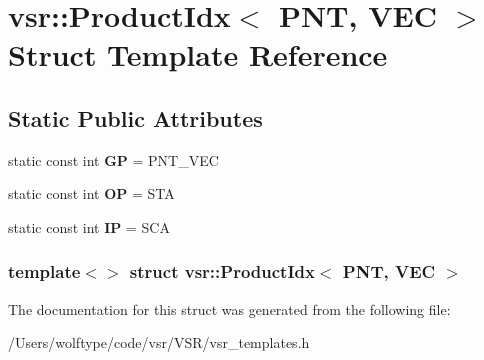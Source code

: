 \hypertarget{structvsr_1_1_product_idx_3_01_p_n_t_00_01_v_e_c_01_4}{\section{vsr\-:\-:Product\-Idx$<$ P\-N\-T, V\-E\-C $>$ Struct Template Reference}
\label{structvsr_1_1_product_idx_3_01_p_n_t_00_01_v_e_c_01_4}
}
\subsection*{Static Public Attributes}
\begin{DoxyCompactItemize}
\item 
\hypertarget{structvsr_1_1_product_idx_3_01_p_n_t_00_01_v_e_c_01_4_a452d473d4eb7dd288879a5a8f9f298d2}{static const int {\bfseries G\-P} = P\-N\-T\-\_\-\-V\-E\-C}\label{structvsr_1_1_product_idx_3_01_p_n_t_00_01_v_e_c_01_4_a452d473d4eb7dd288879a5a8f9f298d2}

\item 
\hypertarget{structvsr_1_1_product_idx_3_01_p_n_t_00_01_v_e_c_01_4_afffbc6dbab5e389a833d41a88cf09d4a}{static const int {\bfseries O\-P} = S\-T\-A}\label{structvsr_1_1_product_idx_3_01_p_n_t_00_01_v_e_c_01_4_afffbc6dbab5e389a833d41a88cf09d4a}

\item 
\hypertarget{structvsr_1_1_product_idx_3_01_p_n_t_00_01_v_e_c_01_4_aec5cf09ff9019dd3f8cfc39884b3b0c3}{static const int {\bfseries I\-P} = S\-C\-A}\label{structvsr_1_1_product_idx_3_01_p_n_t_00_01_v_e_c_01_4_aec5cf09ff9019dd3f8cfc39884b3b0c3}

\end{DoxyCompactItemize}
\subsubsection*{template$<$$>$ struct vsr\-::\-Product\-Idx$<$ P\-N\-T, V\-E\-C $>$}



The documentation for this struct was generated from the following file\-:\begin{DoxyCompactItemize}
\item 
/\-Users/wolftype/code/vsr/\-V\-S\-R/vsr\-\_\-templates.\-h\end{DoxyCompactItemize}
